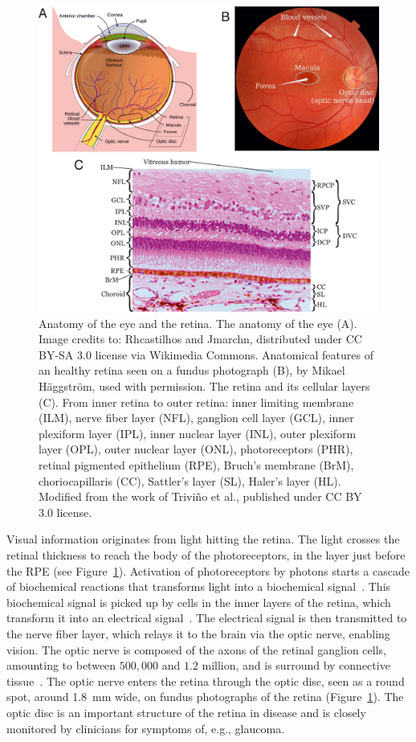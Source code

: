 \documentclass{article}
\begin{document}
\begin{figure}[t!]
  \centering
  \includegraphics[width=.95\textwidth]{Figure1}
  \caption{Anatomy of the eye and the retina. The anatomy of the eye (A). Image credits to: Rhcastilhos and Jmarchn, distributed under CC BY-SA 3.0 license via Wikimedia Commons. Anatomical features of an healthy retina seen on a fundus photograph (B), by Mikael H\"aggstr\"om, used with permission. The retina and its cellular layers (C). From inner retina to outer retina: inner limiting membrane (ILM), nerve fiber layer (NFL), ganglion cell layer (GCL), inner plexiform layer (IPL), inner nuclear layer (INL), outer plexiform layer (OPL), outer nuclear layer (ONL), photoreceptors (PHR), retinal pigmented epithelium (RPE), Bruch's membrane (BrM), choriocapillaris (CC), Sattler's layer (SL), Haler's layer (HL). Modified from the work of Trivi\~no et al., published under CC BY 3.0 license.~\cite{Trivino_2012}}
  \label{fig:architecture-eye}
\end{figure}


Visual information originates from light hitting the retina.
The light crosses the retinal thickness to reach the body of the photoreceptors, in the layer just before the RPE (see Figure~\ref{fig:architecture-eye}).
Activation of photoreceptors by photons starts a cascade of biochemical reactions that transforms light into a biochemical signal~\cite{Hurley_2009}.
This biochemical signal is picked up by cells in the inner layers of the retina, which transform it into an electrical signal~\cite{Arslan_2018}.
The electrical signal is then transmitted to the nerve fiber layer, which relays it to the brain via the optic nerve, enabling vision.
The optic nerve is composed of the axons of the retinal ganglion cells, amounting to between $500,000$ and $1.2$ million, and is surround by connective tissue~\cite{Salazar_2019}.
The optic nerve enters the retina through the optic disc, seen as a round spot, around \SI{1.8}{\mm} wide, on fundus photographs of the retina (Figure~\ref{fig:architecture-eye}).
The optic disc is an important structure of the retina in disease and is closely monitored by clinicians for symptoms of, e.g., glaucoma.
\end{document}
